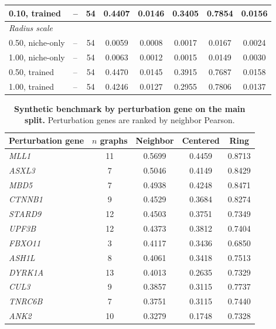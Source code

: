 \documentclass[sigconf,anonymous,review]{acmart}
\begin{document}
\begin{table}[t]
\begin{tabular}{llcccccc}
0.10, trained & -- & 54 & 0.4407 & 0.0146 & 0.3405 & 0.7854 & 0.0156 \\
\midrule
\multicolumn{8}{l}{\textit{Radius scale}} \\
0.50, niche-only & -- & 54 & 0.0059 & 0.0008 & 0.0017 & 0.0167 & 0.0024 \\
1.00, niche-only & -- & 54 & 0.0063 & 0.0012 & 0.0015 & 0.0149 & 0.0030 \\
0.50, trained & -- & 54 & 0.4470 & 0.0145 & 0.3915 & 0.7687 & 0.0158 \\
1.00, trained & -- & 54 & 0.4246 & 0.0127 & 0.2955 & 0.7806 & 0.0137 \\
\bottomrule
\end{tabular}
\end{table}

\begin{table}[t]
\centering
\small
\setlength{\tabcolsep}{5pt}
\renewcommand{\arraystretch}{1.08}
\caption{\textbf{Synthetic benchmark by perturbation gene on the main split.}
Perturbation genes are ranked by neighbor Pearson.}
\label{tab:synthetic_lr_gene_breakdown}
\begin{tabular}{lcccc}
\toprule
Perturbation gene & $n$ graphs & Neighbor & Centered & Ring \\
\midrule
\textit{MLL1} & 11 & 0.5699 & 0.4459 & 0.8713 \\
\textit{ASXL3} & 7 & 0.5046 & 0.4149 & 0.8429 \\
\textit{MBD5} & 7 & 0.4938 & 0.4248 & 0.8471 \\
\textit{CTNNB1} & 9 & 0.4529 & 0.3684 & 0.8274 \\
\textit{STARD9} & 12 & 0.4503 & 0.3751 & 0.7349 \\
\textit{UPF3B} & 12 & 0.4373 & 0.3812 & 0.7404 \\
\textit{FBXO11} & 3 & 0.4117 & 0.3436 & 0.6850 \\
\textit{ASH1L} & 8 & 0.4061 & 0.3418 & 0.7513 \\
\textit{DYRK1A} & 13 & 0.4013 & 0.2635 & 0.7329 \\
\textit{CUL3} & 9 & 0.3857 & 0.3115 & 0.7737 \\
\textit{TNRC6B} & 7 & 0.3751 & 0.3115 & 0.7440 \\
\textit{ANK2} & 10 & 0.3279 & 0.1748 & 0.7328 \\
\bottomrule
\end{tabular}
\end{table}
\end{document}
